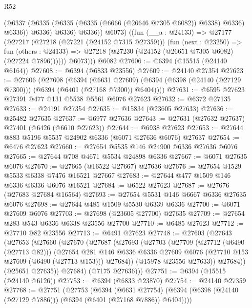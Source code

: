 \begin{lexlean}{R52}
\begin{coremodule}
                (@6337 (@6335 (@6335 (@6335 (@6666 (@26646 @7305 @6082)) @6338) @6336) @6336))
                @6336)
              @6336)
            @6336))
          @6073)
        ((fun (__a : @24133) =>
        @27177
          (@27217
            (@27218 (@27221 (@24152 @7315 @27359)))
            (fun (next : @23250) =>
            fun (others : @24133) => @27218 (@27230 (@24152 (@26651 @7305 @6082) (@27224 @7896))))))
          @6073)))
    @6082
@27606 := @6394 (@15515 (@24140 @6164))
@27608 := @6394 (@6833 @23556)
@27609 := @24140 @27354
@27623 := @27606
    (@27608
      (@6394
        (@6631 @27609)
        (@6394 (@6398 (@24140 (@27129 @7300))) (@6394 (@6401 (@27168 @7300)) @6404))))
@27631 := @6595 @27623 @27391 @477 @131 @5538 @5561 @6076 @27623
@27632 := @6372 @27135
@27633 := @24191 @27354
@27635 := @15834 (@23605 @27633)
@27636 := @25482 @27635
@27637 := @6977 @27636
@27643 := @27631 (@27632 @27637) @27401 (@6426 (@6610 @27623))
@27644 := @6938 @27623
@27653 := @27644 @883 @5196 @5537 @24902 @6336 (@6071 @27636 @6076) @27637
@27654 := @6476 @27623
@27660 := @27654 @5535 @146 @24900 @6336 @27636 @6076
@27665 := @27644 @708 @4671 @5534 @24898 @6336
@27667 := @6071 @27635 @6076
@27670 := @27665 (@16522 @27667) @27636
@27676 := @27654 @1529 @5533 @6338 @7476 @16521 @27667
@27683 := @27644 @477 @1509 @146 @6336 @6336 @6076 @16521
@27684 := @6522 @27623
@27687 := @27676 (@27683 @27684 @16564)
@27693 := @27654 @5531 @146 @6667 @6336 @27635 @6076
@27698 := @27644 @485 @1509 @5530 @6339 @6336
@27700 := @6071 @27609 @6076
@27703 := @27698 (@23605 @27700) @27635
@27709 := @27654 @283 @543 @6336 @6338 @23556 @27700
@27710 := @6485 @27623
@27712 := @27710 @82 @23556
@27713 := @6491 @27623
@27748 := @27603
    (@27643
      (@27653
        (@27660
          (@27670
            (@27687
              (@27693
                (@27703
                  (@27709
                    (@27712 (@6490 (@27713 @82)))
                    (@27654
                      @281
                      @146
                      @6336
                      @6336
                      @27609
                      @6076
                      (@27710 @153 @27609 (@6490 (@27713 @153)))
                      @27684))
                  (@15978 @23556 @27633))
                @27684))
            (@25651 @27635))
          @27684)
        (@7175 @27636)))
@27751 := @6394 (@15515 (@24140 @6126))
@27753 := @6394 (@6833 @23870)
@27754 := @24140 @27359
@27768 := @27751
    (@27753
      (@6394
        (@6631 @27754)
        (@6394 (@6398 (@24140 (@27129 @7886))) (@6394 (@6401 (@27168 @7886)) @6404))))

\end{coremodule}
\end{lexlean}
